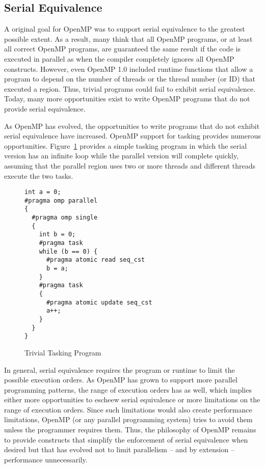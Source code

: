 \subsection{Serial Equivalence}
\label{sub:serial_equivalence}

A original goal for OpenMP was to support serial equivalence to the 
greatest possible extent. As a result, many think that all OpenMP programs, 
or at least all correct OpenMP programs, are guaranteed the same result
if the code is executed in parallel as when the compiler completely 
ignores all OpenMP constructs. However, even OpenMP 1.0 included runtime
functions that allow a program to depend on the number of threads or the
thread number (or ID) that executed a region. Thus, trivial programs could
fail to exhibit serial equivalence. Today, many more opportunities exist
to write OpenMP programs that do not provide serial equivalence. 


As OpenMP has evolved, the opportunities to write programs that do not
exhibit serial equivalence have increased. OpenMP support for tasking 
provides numerous opportunities. Figure~\ref{fig:trivial_task} provides
a simple tasking program in which the serial version has an infinite loop
while the parallel version will complete quickly, assuming that the parallel
region uses two or more threads and different threads execute the two tasks.

\begin{figure}
\begin{verbatim}
int a = 0;
#pragma omp parallel
{
  #pragma omp single 
  {
    int b = 0;
    #pragma task
    while (b == 0) {
      #pragma atomic read seq_cst
      b = a;
    }
    #pragma task
    {
      #pragma atomic update seq_cst
      a++;
    }
  }
}
\end{verbatim}
\caption{Trivial Tasking Program}
\label{fig:trivial_task}
\end{figure}


In general, serial equivalence requires the program or runtime to limit
the possible execution orders. As OpenMP has grown to support more parallel 
programming patterns, the range of execution orders has as well, which 
implies either more opportunities to escheew serial equivalence or more
limitations on the range of execution orders. Since such limitations would 
also create performance limitations, OpenMP (or any parallel programming 
system) tries to avoid them unless the programmer requires them. Thus, the 
philosophy of OpenMP remains to provide constructs that simplify the 
enforcement of serial equivalence when desired but that has evolved not 
to limit parallelism -- and by extension -- performance unnecessarily.

